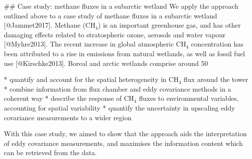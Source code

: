 ## Case study: methane fluxes in a subarctic wetland
We apply the approach outlined above to a case study of methane fluxes in a subarctic wetland [@Jammet2017]. Methane (CH$_4$) is an important greenhouse gas, and has other damaging effects related to stratospheric ozone, aerosols and water vapour [@Myhre2013]. The recent increase in global atmospheric CH$_4$ concentration has been attributed to a rise in emissions from natural wetlands, as well as fossil fuel use [@Kirschke2013]. Boreal and arctic wetlands comprise around 50 %
 
* quantify and account for the spatial heterogeneity in CH$_4$ flux around the tower
* combine information from flux chamber and eddy covariance methods in a coherent way
* describe the response of CH$_4$ fluxes to environmental variables, accounting for spatial variability  
* quantify the uncertainty in upscaling eddy covariance measurements to a wider region

With this case study, we aimed to show that the approach aids the interpretation of eddy covariance measurements, and maximises the information content which can be retrieved from the data.